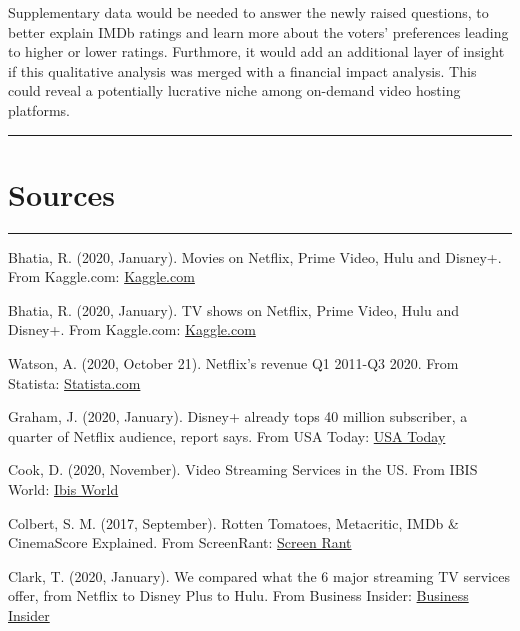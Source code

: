 \documentclass[
]{article}
\begin{document}
Supplementary data would be needed to answer the newly raised questions,
to better explain IMDb ratings and learn more about the voters'
preferences leading to higher or lower ratings. Furthmore, it would add
an additional layer of insight if this qualitative analysis was merged
with a financial impact analysis. This could reveal a potentially
lucrative niche among on-demand video hosting platforms.

\begin{center}\rule{0.5\linewidth}{0.5pt}\end{center}

\hypertarget{sources}{%
\section{Sources}\label{sources}}

\begin{center}\rule{0.5\linewidth}{0.5pt}\end{center}

Bhatia, R. (2020, January). Movies on Netflix, Prime Video, Hulu and
Disney+. From Kaggle.com:
\href{https://www.kaggle.com/ruchi798/movies-on-netflix-prime-video-hulu-and-disney}{Kaggle.com}

Bhatia, R. (2020, January). TV shows on Netflix, Prime Video, Hulu and
Disney+. From Kaggle.com:
\href{https://www.kaggle.com/ruchi798/tv-shows-on-netflix-prime-video-hulu-and-disney}{Kaggle.com}

Watson, A. (2020, October 21). Netflix's revenue Q1 2011-Q3 2020. From
Statista:
\href{https://www.statista.com/statistics/273883/netflixs-quarterly-revenue/}{Statista.com}

Graham, J. (2020, January). Disney+ already tops 40 million subscriber,
a quarter of Netflix audience, report says. From USA Today:
\href{https://www.usatoday.com/story/tech/2020/01/15/disney-has-over-40-m-subscribers-1-4-size-netflix-2-months/4469107002/}{USA
Today}

Cook, D. (2020, November). Video Streaming Services in the US. From IBIS
World:
\href{https://my-ibisworld-com.hult.idm.oclc.org/us/en/industry-specialized/od6197/competitive-landscape}{Ibis
World}

Colbert, S. M. (2017, September). Rotten Tomatoes, Metacritic, IMDb \&
CinemaScore Explained. From ScreenRant:
\href{https://screenrant.com/rotten-tomatoes-metacritic-imdb-cinemascore-explained/}{Screen
Rant}

Clark, T. (2020, January). We compared what the 6 major streaming TV
services offer, from Netflix to Disney Plus to Hulu. From Business
Insider:
\href{https://www.businessinsider.com/streaming-comparison-netflix-disney-plus-hulu-prime-video-2020-1}{Business
Insider}
\end{document}
